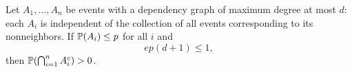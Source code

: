 \begin{theorem}
Let $A_1, \dots, A_n$ be events with a dependency graph of maximum degree at most $d$: each $A_i$ is independent of the collection of all events corresponding to its nonneighbors. If $\mathbb{P}(A_i)\le p$ for all $i$ and
\[
 ep(d+1)\le1,
\]
then $\mathbb{P}\!\left(\bigcap_{i=1}^n A_i^c\right)>0$.
\end{theorem}
